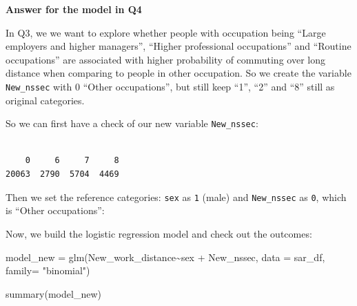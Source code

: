 \documentclass[
  letterpaper,
  DIV=11,
  numbers=noendperiod]{scrreprt}
\newenvironment{Shaded}{\begin{snugshade}}{\end{snugshade}}
\newcommand{\AttributeTok}[1]{\textcolor[rgb]{0.40,0.45,0.13}{#1}}
\newcommand{\FunctionTok}[1]{\textcolor[rgb]{0.28,0.35,0.67}{#1}}
\newcommand{\NormalTok}[1]{\textcolor[rgb]{0.00,0.23,0.31}{#1}}
\newcommand{\OtherTok}[1]{\textcolor[rgb]{0.00,0.23,0.31}{#1}}
\newcommand{\SpecialCharTok}[1]{\textcolor[rgb]{0.37,0.37,0.37}{#1}}
\newcommand{\StringTok}[1]{\textcolor[rgb]{0.13,0.47,0.30}{#1}}
\begin{document}
\textbf{Answer for the model in Q4}

In Q3, we we want to explore whether people with occupation being
``Large employers and higher managers'', ``Higher professional
occupations'' and ``Routine occupations'' are associated with higher
probability of commuting over long distance when comparing to people in
other occupation. So we create the variable \texttt{New\_nssec} with 0
``Other occupations'', but still keep ``1'', ``2'' and ``8'' still as
original categories.

So we can first have a check of our new variable \texttt{New\_nssec}:

\begin{Shaded}
\end{Shaded}

\begin{verbatim}

    0     6     7     8 
20063  2790  5704  4469 
\end{verbatim}

Then we set the reference categories: \texttt{sex} as \texttt{1} (male)
and \texttt{New\_nssec} as \texttt{0}, which is ``Other occupations'':

\begin{Shaded}
\end{Shaded}

Now, we build the logistic regression model and check out the outcomes:

\begin{Shaded}
\begin{Highlighting}[]
\NormalTok{model\_new }\OtherTok{=} \FunctionTok{glm}\NormalTok{(New\_work\_distance}\SpecialCharTok{\textasciitilde{}}\NormalTok{sex }\SpecialCharTok{+}\NormalTok{ New\_nssec, }\AttributeTok{data =}\NormalTok{ sar\_df, }\AttributeTok{family=} \StringTok{"binomial"}\NormalTok{)}

\FunctionTok{summary}\NormalTok{(model\_new)}
\end{Highlighting}
\end{Shaded}
\end{document}
